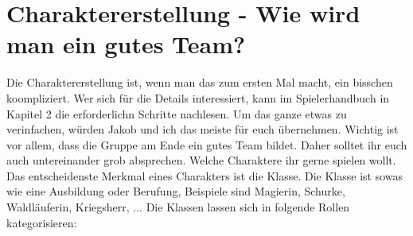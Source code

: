 \documentclass[a4paper]{article}
\begin{document}
\section*{Charaktererstellung - Wie wird man ein gutes Team?}
Die Charaktererstellung ist, wenn man das zum ersten Mal macht, ein bisschen
koompliziert. Wer sich für die Details interessiert, kann im Spielerhandbuch
in Kapitel 2 die erforderlichn Schritte nachlesen. Um das ganze etwas zu
verinfachen, würden Jakob und ich das meiste für euch übernehmen. Wichtig ist
vor allem, dass die Gruppe am Ende ein gutes Team bildet. Daher solltet ihr
euch auch untereinander grob absprechen. Welche Charaktere ihr gerne spielen
wollt. Das entscheidenste Merkmal eines Charakters ist die Klasse. Die Klasse
ist sowas wie eine Ausbildung oder Berufung, Beispiele sind Magierin, Schurke,
Waldläuferin, Kriegsherr, ... Die Klassen lassen sich in folgende Rollen
kategorisieren:
\end{document}
